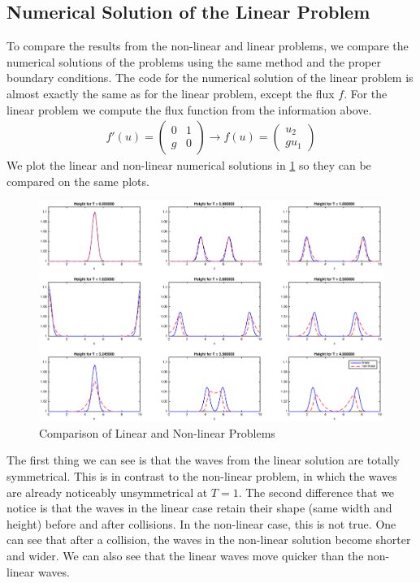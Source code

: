 \subsection{Numerical Solution of the Linear Problem}
To compare the results from the non-linear and linear problems, we compare the numerical solutions of the problems using the same method and the proper boundary conditions. The code for the numerical solution of the linear problem is almost exactly the same as for the linear problem, except the flux $f$. For the linear problem we compute the flux function from the information above. 
\begin{align*}
f'(u) = \begin{pmatrix}
0 & 1 \\
g & 0
\end{pmatrix} \rightarrow 
f(u) = \begin{pmatrix}
u_2 \\
gu_1
\end{pmatrix}
\end{align*}
We plot the linear and non-linear numerical solutions in \ref{compare} so they can be compared on the same plots. 
\begin{figure}
\begin{center}
\includegraphics[scale=0.4]{222comparison.eps}
\caption{Comparison of Linear and Non-linear Problems}
\label{compare}
\end{center}
\end{figure}
The first thing we can see is that the waves from the linear solution are totally symmetrical. This is in contrast to the non-linear problem, in which the waves are already noticeably unsymmetrical at $T=1$. The second difference that we notice is that the waves in the linear case retain their shape (same width and height) before and after collisions. In the non-linear case, this is not true. One can see that after a collision, the waves in the non-linear solution become shorter and wider. We can also see that the linear waves move quicker than the non-linear waves. 